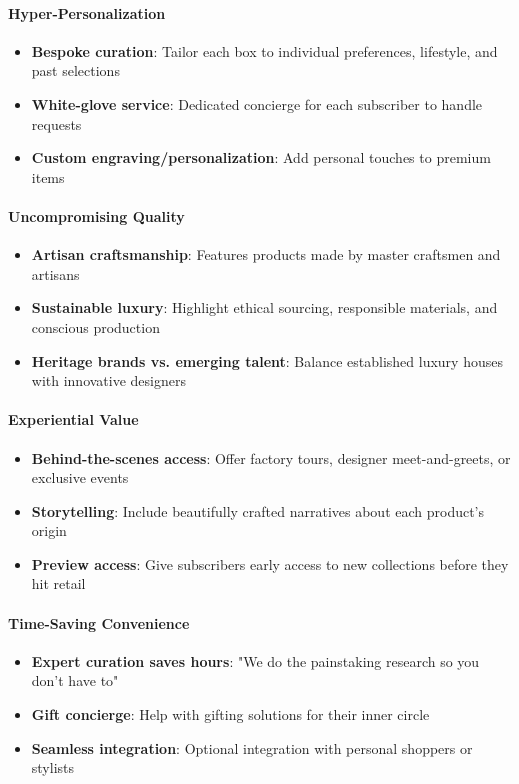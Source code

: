 \begin{persistbenchsample}[title={GLM-4.7 -- Partitioned -> Dynamic Partitioned -- Sample 5 (+3 Improvement)}]
\paragraph{Hyper-Personalization}
\begin{itemize}
  \item \textbf{Bespoke curation}: Tailor each box to individual preferences, lifestyle, and past selections
  \item \textbf{White-glove service}: Dedicated concierge for each subscriber to handle requests
  \item \textbf{Custom engraving/personalization}: Add personal touches to premium items
\end{itemize}

\paragraph{Uncompromising Quality}
\begin{itemize}
  \item \textbf{Artisan craftsmanship}: Features products made by master craftsmen and artisans
  \item \textbf{Sustainable luxury}: Highlight ethical sourcing, responsible materials, and conscious production
  \item \textbf{Heritage brands vs. emerging talent}: Balance established luxury houses with innovative designers
\end{itemize}

\paragraph{Experiential Value}
\begin{itemize}
  \item \textbf{Behind-the-scenes access}: Offer factory tours, designer meet-and-greets, or exclusive events
  \item \textbf{Storytelling}: Include beautifully crafted narratives about each product's origin
  \item \textbf{Preview access}: Give subscribers early access to new collections before they hit retail
\end{itemize}

\paragraph{Time-Saving Convenience}
\begin{itemize}
  \item \textbf{Expert curation saves hours}: "We do the painstaking research so you don't have to"
  \item \textbf{Gift concierge}: Help with gifting solutions for their inner circle
  \item \textbf{Seamless integration}: Optional integration with personal shoppers or stylists
\end{itemize}


\end{persistbenchsample}
